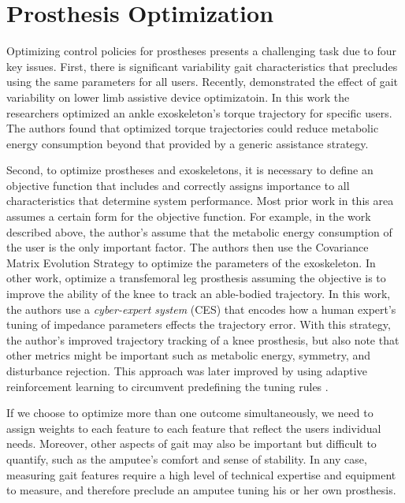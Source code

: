 \section{Prosthesis Optimization}\label{sec:back_optimization}

Optimizing control policies for prostheses presents a challenging task due to
four key issues. First, there is significant variability gait characteristics
that precludes using the same parameters for all users. Recently,
\citet{zhang2017human} demonstrated the effect of gait variability on lower limb
assistive device optimizatoin. In this work the researchers optimized an ankle
exoskeleton's torque trajectory for specific users. The authors found that
optimized torque trajectories could reduce metabolic energy consumption beyond
that provided by a generic assistance strategy.
 
Second, to optimize prostheses and exoskeletons, it is necessary to define an
objective function that includes and correctly assigns importance to all
characteristics that determine system performance. Most prior work in this area
assumes a certain form for the objective function. For example, in the work
described above, the author's assume that the metabolic energy consumption of
the user is the only important factor. The authors then use the Covariance
Matrix Evolution Strategy \citep{hansen2006cma} to optimize the parameters of
the exoskeleton. In other work, \citet{huang2016cyber} optimize a transfemoral
leg prosthesis assuming the objective is to improve the ability of the knee to
track an able-bodied trajectory. In this work, the authors use a
\emph{cyber-expert system} (CES) that encodes how a human expert's tuning of
impedance parameters effects the trajectory error. With this strategy, the
author's improved trajectory tracking of a knee prosthesis, but also note that
other metrics might be important such as metabolic energy, symmetry, and
disturbance rejection. This approach was later improved by using adaptive
reinforcement learning to circumvent predefining the tuning rules
\citep{wen2016adaptive,wen2019online}. 

If we choose to optimize more than one outcome simultaneously, we need to
assign weights to each feature to each feature that reflect the users individual
needs. Moreover, other aspects of gait may also be important but difficult to
quantify, such as the amputee's comfort and sense of stability. In any case,
measuring gait features require a high level of technical expertise and
equipment to measure, and therefore preclude an amputee tuning his or her own
prosthesis.

